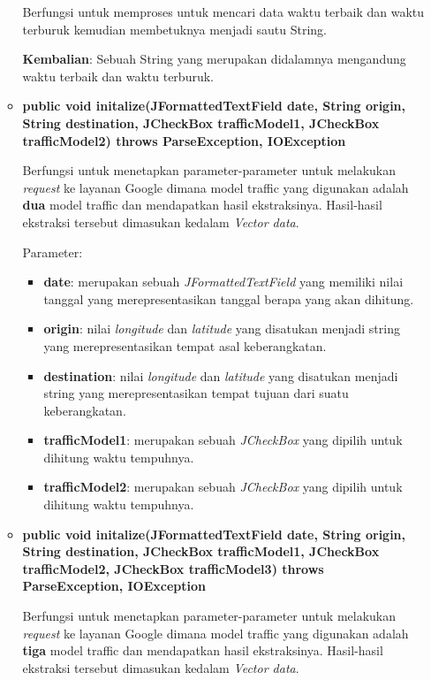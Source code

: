\begin{enumerate}
\begin{itemize}
		Berfungsi untuk memproses untuk mencari data waktu terbaik dan waktu terburuk kemudian membetuknya menjadi sautu String.
		
		\textbf{Kembalian}: Sebuah String yang merupakan didalamnya mengandung waktu terbaik dan waktu terburuk.
		
		\item \textbf{public void initalize(JFormattedTextField date, String origin, String destination, JCheckBox trafficModel1, JCheckBox trafficModel2) throws ParseException, IOException}
		
		Berfungsi untuk menetapkan parameter-parameter untuk melakukan \textit{request} ke layanan Google dimana model traffic yang digunakan adalah \textbf{dua} model traffic dan mendapatkan hasil ekstraksinya. Hasil-hasil ekstraksi tersebut dimasukan kedalam \textit{Vector data}.
		
		Parameter:
	\begin{itemize}
		\item \textbf{date}: merupakan sebuah \textit{JFormattedTextField} yang memiliki nilai tanggal yang merepresentasikan tanggal berapa yang akan dihitung. 
		\item \textbf{origin}: nilai \textit{longitude} dan \textit{latitude} yang disatukan menjadi string yang merepresentasikan tempat asal keberangkatan.
		\item \textbf{destination}: nilai \textit{longitude} dan \textit{latitude} yang disatukan menjadi string yang merepresentasikan tempat tujuan dari suatu keberangkatan.
		\item \textbf{trafficModel1}: merupakan sebuah \textit{JCheckBox} yang dipilih untuk dihitung waktu tempuhnya.
		\item \textbf{trafficModel2}: merupakan sebuah \textit{JCheckBox} yang dipilih untuk dihitung waktu tempuhnya.
	\end{itemize}
		
		\item \textbf{public void initalize(JFormattedTextField date, String origin, String destination, JCheckBox trafficModel1, JCheckBox trafficModel2, JCheckBox trafficModel3) throws ParseException, IOException}
		
		Berfungsi untuk menetapkan parameter-parameter untuk melakukan \textit{request} ke layanan Google dimana model traffic yang digunakan adalah \textbf{tiga} model traffic dan mendapatkan hasil ekstraksinya. Hasil-hasil ekstraksi tersebut dimasukan kedalam \textit{Vector data}.
		

\end{itemize}
\end{enumerate}
